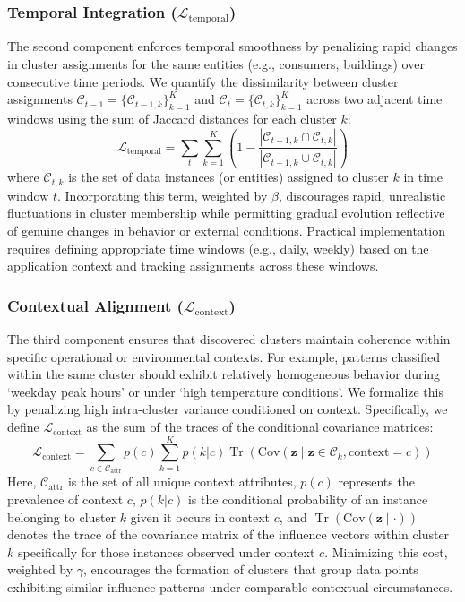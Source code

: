 \documentclass[final,authoryear,3p,times,review,sort&compress]{elsarticle}
\newcommand{\vect}[1]{\mathbf{#1}}
\newcommand{\set}[1]{\mathcal{#1}}
\DeclareMathOperator{\Tr}{Tr} %
\begin{document}
\subsubsection{Temporal Integration ($\mathcal{L}_{\text{temporal}}$)}
\label{sec:temporal_integration}
The second component enforces temporal smoothness by penalizing rapid changes in cluster assignments for the same entities (e.g., consumers, buildings) over consecutive time periods. We quantify the dissimilarity between cluster assignments $\set{C}_{t-1} = \{\set{C}_{t-1,k}\}_{k=1}^K$ and $\set{C}_t = \{\set{C}_{t,k}\}_{k=1}^K$ across two adjacent time windows using the sum of Jaccard distances for each cluster $k$:
\begin{equation}
\label{eq:d_cluster}
    \mathcal{L}_{\text{temporal}} = \sum_{t} \sum_{k=1}^K \left( 1 - \frac{|\set{C}_{t-1,k} \cap \set{C}_{t,k}|}{|\set{C}_{t-1,k} \cup \set{C}_{t,k}|} \right)
\end{equation}
where $\set{C}_{t,k}$ is the set of data instances (or entities) assigned to cluster $k$ in time window $t$. Incorporating this term, weighted by $\beta$, discourages rapid, unrealistic fluctuations in cluster membership while permitting gradual evolution reflective of genuine changes in behavior or external conditions. Practical implementation requires defining appropriate time windows (e.g., daily, weekly) based on the application context and tracking assignments across these windows.

\subsubsection{Contextual Alignment ($\mathcal{L}_{\text{context}}$)}
\label{sec:contextual_alignment}
The third component ensures that discovered clusters maintain coherence within specific operational or environmental contexts. For example, patterns classified within the same cluster should exhibit relatively homogeneous behavior during `weekday peak hours' or under `high temperature conditions'. We formalize this by penalizing high intra-cluster variance conditioned on context. Specifically, we define $\mathcal{L}_{\text{context}}$ as the sum of the traces of the conditional covariance matrices:
\begin{equation}
\label{eq:context_cost}
 \mathcal{L}_{\text{context}} = \sum_{c \in \set{C}_{\text{attr}}} p(c) \sum_{k=1}^K p(k|c) \Tr(\text{Cov}(\vect{z} \mid \vect{z} \in \set{C}_k, \text{context}=c))
\end{equation}
Here, $\set{C}_{\text{attr}}$ is the set of all unique context attributes, $p(c)$ represents the prevalence of context $c$, $p(k|c)$ is the conditional probability of an instance belonging to cluster $k$ given it occurs in context $c$, and $\Tr(\text{Cov}(\vect{z} \mid \cdot))$ denotes the trace of the covariance matrix of the influence vectors within cluster $k$ specifically for those instances observed under context $c$. Minimizing this cost, weighted by $\gamma$, encourages the formation of clusters that group data points exhibiting similar influence patterns under comparable contextual circumstances.
\end{document}
